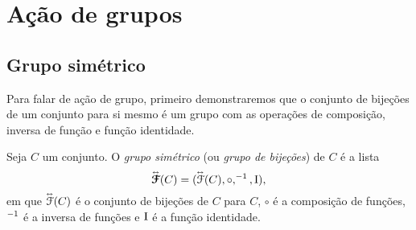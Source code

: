 \section{Ação de grupos}

\subsection{Grupo simétrico}

Para falar de ação de grupo, primeiro demonstraremos que o conjunto de bijeções de um conjunto para si mesmo é um grupo com as operações de composição, inversa de função e função identidade.

\begin{definition}
Seja $C$ um conjunto. O \emph{grupo simétrico} (ou \emph{grupo de bijeções}) de $C$ é a lista
	\begin{equation*}
	\accentset{\leftrightarrow}{\bm{\mathcal{F}}}(C) = (\accentset{\leftrightarrow}{\mathcal{F}}(C),\circ,^{-1},\mathrm{I}),
	\end{equation*}
em que $\accentset{\leftrightarrow}{\mathcal{F}}(C)$ é o conjunto de bijeções de $C$ para $C$, $\circ$ é a composição de funções, $^{-1}$ é a inversa de funções e $\mathrm{I}$ é a função identidade.
\end{definition}

